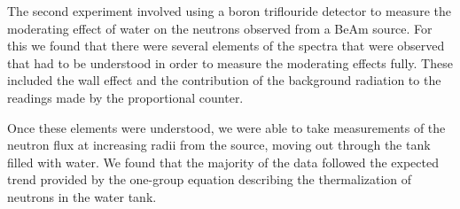 The second experiment involved using a boron triflouride detector to measure the moderating effect of water on the neutrons observed from a BeAm source. For this we found that there were several elements of the spectra that were observed that had to be understood in order to measure the moderating effects fully. These included the wall effect and the contribution of the background radiation to the readings made by the proportional counter. 

Once these elements were understood, we were able to take measurements of the neutron flux at increasing radii from the source, moving out through the tank filled with water. We found that the majority of the data followed the expected trend provided by the one-group equation describing the thermalization of neutrons in the water tank.

